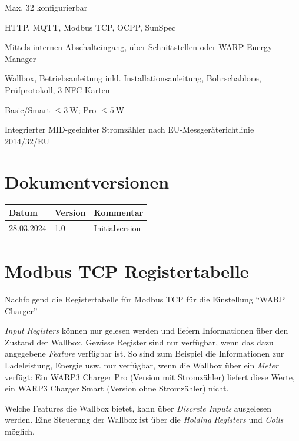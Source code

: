 \documentclass[a4paper,10pt]{article}
\begin{document}
\begin{multicols*}{2}
\begin{minipage}{\linewidth}
\begin{description}[leftmargin=!,labelwidth=\widthof{\textbf{Fehlerstromerkennung}}]
            \item[Benutzer] Max. 32 konfigurierbar~
            \item[Schnittstellen] HTTP, MQTT, Modbus TCP, OCPP, SunSpec~
            \item[\S14a EnWG steuerbar] Mittels internen Abschalteingang, über Schnittstellen oder WARP Energy Manager
            \item[Lieferumfang] Wallbox, Betriebsanleitung inkl. Installationsanleitung, Bohrschablone, Prüfprotokoll, 3 NFC-Karten

            \item[Standby, WLAN an] Basic/Smart $\leq\SI{3}{\watt}$; Pro $\leq\SI{5}{\watt}$
            \item[Strommessung] Integrierter MID-geeichter Strom\-zähler nach EU-Messgeräterichtlinie 2014/32/EU~




        \end{description}
    \end{minipage}

    \section{Dokumentversionen}
    \begin{tabular}{lll}
        \toprule
        Datum      & Version\hspace{-0.2pt} & Kommentar        \\
        \midrule
        28.03.2024 & 1.0     & Initialversion                  \\
        \bottomrule
    \end{tabular}

\appendix

\section{Modbus TCP Registertabelle}
\label{modbus_tcp_registertabelle}
Nachfolgend die Registertabelle für Modbus TCP für die Einstellung \enquote{WARP
Charger}

\textit{Input Registers} können nur gelesen werden und liefern Informationen über den
Zustand der Wallbox. Gewisse Register sind nur verfügbar, wenn das dazu
angegebene \textit{Feature} verfügbar ist. So sind zum Beispiel die
Informationen zur Ladeleistung, Energie usw. nur verfügbar, wenn die Wallbox
über ein \textit{Meter} verfügt: Ein WARP3 Charger Pro (Version mit
Stromzähler) liefert diese Werte, ein WARP3 Charger Smart (Version ohne
Stromzähler) nicht.

Welche Features die Wallbox bietet, kann über \textit{Discrete Inputs} ausgelesen
werden. Eine Steuerung der Wallbox ist über die \textit{Holding Registers} und \textit{Coils}
möglich.
\end{multicols*}
\end{document}
